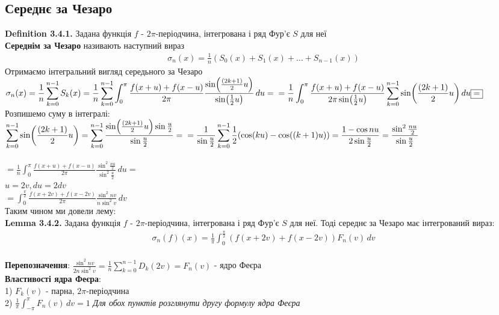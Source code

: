 \documentclass[a4paper, 10pt]{article}
\def\hugespace{\vspace{5mm} \\}
\theoremstyle{theoremdd}
\theoremstyle{theoremdd}
\theoremstyle{theoremdd}
\theoremstyle{theoremdd}
\theoremstyle{theoremdd}
\theoremstyle{theoremdd}
\theoremstyle{theoremdd}
\theoremstyle{theoremdd}
\begin{document}
\subsection{Середнє за Чезаро}
\textbf{Definition 3.4.1.} Задана функція $f$ - $2\pi$-періодчина, інтегрована і ряд Фур'є $S$ для неї\\
\textbf{Середнім за Чезаро} називають наступний вираз
\begin{align*}
\sigma_n(x) = \frac{1}{n} \left( S_0(x) + S_1(x) + \dots + S_{n-1}(x) \right)
\end{align*}
Отримаємо інтегральний вигляд середьного за Чезаро\\
$\displaystyle \sigma_n(x) = \frac{1}{n} \sum_{k=0}^{n-1}S_k(x) = \frac{1}{n} \sum_{k=0}^{n-1} \int_{0}^{\pi} \frac{f(x+u) + f(x-u)}{2\pi} \frac{\sin (\frac{(2k+1)}{2}u)}{\sin (\frac{1}{2}u)} \,du =\\
= \frac{1}{n} \int_0^{\pi} \frac{f(x+u) + f(x-u)}{2\pi \sin (\frac{1}{2}u)}\sum_{k=0}^{n-1}  \sin (\frac{(2k+1)}{2}u) \,du \boxed{=}
$\\
Розпишемо суму в інтегралі:\\
$\displaystyle \sum_{k=0}^{n-1}  \sin (\frac{(2k+1)}{2}u) = \sum_{k=0}^{n-1} \frac{\sin (\frac{(2k+1)}{2}u) \sin \frac{u}{2}}{\sin \frac{u}{2}} = \\ = \frac{1}{\sin \frac{u}{2}}\sum_{k=0}^{n-1} \frac{1}{2} (\cos(ku)-\cos((k+1)u)) = \frac{1-\cos nu}{2\sin \frac{u}{2}} = \frac{\sin^2 \frac{nu}{2}}{\sin \frac{u}{2}}$\\
\\
$\displaystyle \boxed{=} \frac{1}{n} \int_0^{\pi} \frac{f(x+u) + f(x-u)}{2\pi} \frac{\sin^2 \frac{nu}{2}}{\sin^2 \frac{u}{2}} \,du = $\\
$u = 2v, du = 2dv$\\
$\displaystyle = \int_0^{\frac{\pi}{2}} \frac{f(x+2v) + f(x-2v)}{2\pi} \frac{\sin^2 nv}{n \sin^2 v} \,dv$\\
Таким чином ми довели лему:
\hugespace
\textbf{Lemma 3.4.2.} Задана функція $f$ - $2\pi$-періодчина, інтегрована і ряд Фур'є $S$ для неї. Тоді середнє за Чезаро має інтегрований вираз:
\begin{align*}
\sigma_n(f)(x) = \frac{1}{\pi}\int_0^{\frac{\pi}{2}} (f(x+2v) + f(x-2v)) F_n(v) \,dv
\end{align*}
\hugespace
\textbf{Перепозначення}: $\displaystyle \frac{\sin^2 nv}{2n \sin^2 v} = \frac{1}{n} \sum_{k=0}^{n-1} D_k(2v) = F_n(v)$ - ядро Феєра
\hugespace
\textbf{Властивості ядра Феєра}:\\
1) $F_k(v)$ - парна, $2\pi$-періодчина\\
2) $\displaystyle \frac{1}{\pi}\int_{-\pi}^{\pi}F_n(v)\,dv = 1$
\textit{Для обох пунктів розглянути другу формулу ядра Феєра}
\hugespace
\end{document}
